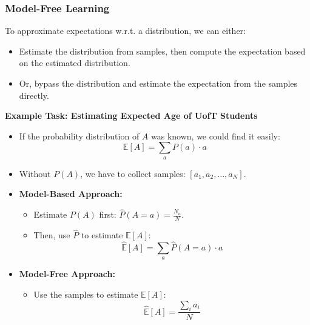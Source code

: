 \subsubsection{Model-Free Learning}
\begin{intuition}
    To approximate expectations w.r.t. a distribution, we can either:
    \begin{itemize}
        \item Estimate the distribution from samples, then compute the expectation based on the estimated distribution.
        \item Or, bypass the distribution and estimate the expectation from the samples directly.
    \end{itemize}
\end{intuition}

\begin{example} \textbf{Example Task: Estimating Expected Age of UofT Students}

    \begin{itemize}
        \item If the probability distribution of $A$ was known, we could find it easily:
        \[
        \mathbb{E}[A] = \sum_a P(a) \cdot a
        \]
        \item Without $P(A)$, we have to collect samples: $[a_1, a_2, \ldots, a_N]$.
        \item \textbf{Model-Based Approach:}
        \begin{itemize}
            \item Estimate $P(A)$ first: $\hat{P}(A=a) = \frac{N_a}{N}$.
            \item Then, use $\hat{P}$ to estimate $\mathbb{E}[A]$: 
            \[
            \hat{\mathbb{E}}[A] = \sum_a \hat{P}(A=a) \cdot a
            \]
        \end{itemize}
        \item \textbf{Model-Free Approach:}
        \begin{itemize}
            \item Use the samples to estimate $\mathbb{E}[A]$:
            \[
            \hat{\mathbb{E}}[A] = \frac{\sum_i a_i}{N}
            \]
        \end{itemize}
    \end{itemize}
\end{example}

